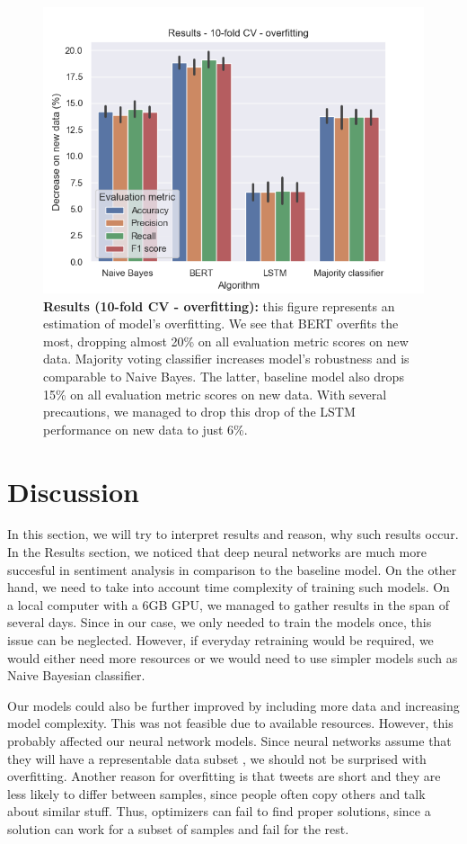 \documentclass[conference]{IEEEtran}
\begin{document}
\begin{figure}[hbt!]\centering
\centering
\includegraphics[width=\linewidth]{cv-overfitting}
\caption{\textbf{Results (10-fold CV - overfitting):} this figure represents an estimation of model's overfitting. We see that BERT overfits the most, dropping almost 20\% on all evaluation metric scores on new data. Majority voting classifier increases model's robustness and is comparable to Naive Bayes. The latter, baseline model also drops 15\% on all evaluation metric scores on new data. With several precautions, we managed to drop this drop of the LSTM performance on new data to just 6\%.}
\label{pic7}
\end{figure}

\section{Discussion}
In this section, we will try to interpret results and reason, why such results occur. In the Results section, we noticed that deep neural networks are much more succesful in sentiment analysis in comparison to the baseline model. On the other hand, we need to take into account time complexity of training such models. On a local computer with a 6GB GPU, we managed to gather results in the span of several days. Since in our case, we only needed to train the models once, this issue can be neglected. However, if everyday retraining would be required, we would either need more resources or we would need to use simpler models such as Naive Bayesian classifier.

Our models could also be further improved by including more data and increasing model complexity. This was not feasible due to available resources. However, this probably affected our neural network models. Since neural networks assume that they will have a representable data subset , we should not be surprised with overfitting. Another reason for overfitting is that tweets are short and they are less likely to differ between samples, since people often copy others and talk about similar stuff. Thus, optimizers can fail to find proper solutions, since a solution can work for a subset of samples and fail for the rest.
\end{document}

